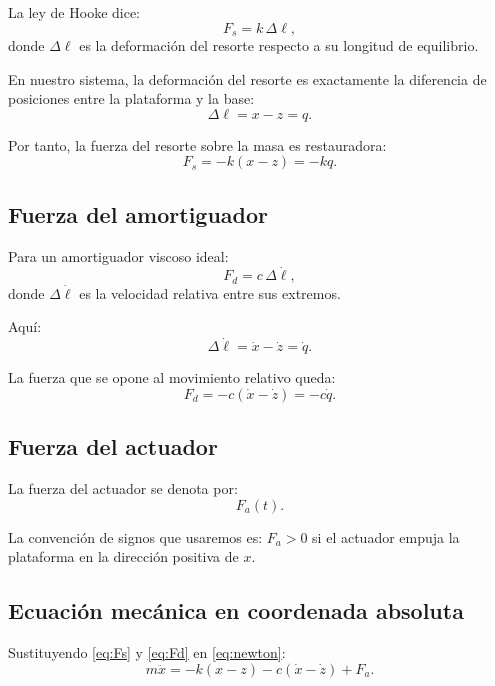 \documentclass[11pt]{article}
\begin{document}
La ley de Hooke dice:
\begin{equation}
F_s = k\,\Delta \ell,
\end{equation}
donde $\Delta \ell$ es la deformaci\'on del resorte respecto a su longitud de equilibrio.

En nuestro sistema, la deformaci\'on del resorte es exactamente la diferencia de posiciones entre la plataforma y la base:
\[
\Delta \ell = x-z = q.
\]

Por tanto, la fuerza del resorte sobre la masa es restauradora:
\begin{equation}
F_s = -k(x-z) = -kq.
\label{eq:Fs}
\end{equation}

\subsection{Fuerza del amortiguador}

Para un amortiguador viscoso ideal:
\begin{equation}
F_d = c\,\Delta \dot{\ell},
\end{equation}
donde $\Delta \dot{\ell}$ es la velocidad relativa entre sus extremos.

Aqu\'i:
\[
\Delta \dot{\ell} = \dot{x}-\dot{z} = \dot{q}.
\]

La fuerza que se opone al movimiento relativo queda:
\begin{equation}
F_d = -c(\dot{x}-\dot{z}) = -c\dot{q}.
\label{eq:Fd}
\end{equation}

\subsection{Fuerza del actuador}

La fuerza del actuador se denota por:
\begin{equation}
F_a(t).
\end{equation}

La convenci\'on de signos que usaremos es: $F_a>0$ si el actuador empuja la plataforma en la direcci\'on positiva de $x$.

\subsection{Ecuaci\'on mec\'anica en coordenada absoluta}

Sustituyendo \eqref{eq:Fs} y \eqref{eq:Fd} en \eqref{eq:newton}:
\begin{equation}
m\ddot{x} = -k(x-z)-c(\dot{x}-\dot{z}) + F_a.
\label{eq:absolute_mech}
\end{equation}
\end{document}
